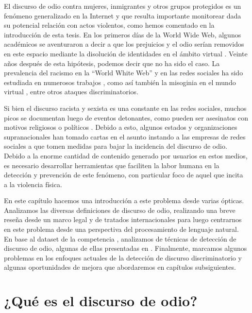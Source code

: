 
\label{chap:04_hate_speech}

El discurso de odio contra mujeres, inmigrantes y otros grupos protegidos es un fenómeno generalizado en la Internet y que resulta importante monitorear dada su potencial relación con actos violentos, como hemos comentado en la introducción de esta tesis. En los primeros días de la World Wide Web, algunos académicos se aventuraron a decir a que los prejuicios y el odio serían removidos en este espacio mediante la disolución de identidades en el ámbito virtual \cite{levy2001cyberculture, rheingold1993virtual}. Veinte años después de esta hipótesis, podemos decir que no ha sido el caso. La prevalencia del racismo en la ``World White Web''  y  en las redes sociales ha sido estudiada en numerosos trabajos \cite{adams2005white, kettrey2014staking}, como así también la misoginia en el mundo virtual \cite{filipovic2007blogging, mantilla2013gendertrolling}, entre otros ataques discriminatorios.

Si bien el discurso racista y sexista es una constante en las redes sociales, muchos picos se documentan luego de eventos detonantes, como pueden ser asesinatos con motivos religiosos o políticos \cite{burnap2015cyber}. Debido a esto, algunos estados y organizaciones supranacionales han tomado cartas en el asunto instando a las empresas de redes sociales a que tomen medidas para bajar la incidencia del discurso de odio. Debido a la enorme cantidad de contenido generado por usuarios en estos medios, es necesario desarrollar herramientas que faciliten la labor humana en la detección y prevención de este fenómeno, con particular foco de aquel que incita a la violencia física.


En este capítulo hacemos una introducción a este problema desde varias ópticas. Analizamos las diversas definiciones de discurso de odio, realizando una breve reseña desde un marco legal y de tratados internacionales para luego centrarnos en este problema desde una perspectiva del procesamiento de lenguaje natural. En base al dataset de la competencia \hateval{} \cite{hateval2019semeval}, analizamos de técnicas de detección de discurso de odio, algunas de ellas presentadas en \citet{perez-2019-atalaya}. Finalmente, marcamos algunos problemas en los enfoques actuales de la detección de discurso discriminatorio y algunas oportunidades de mejora que abordaremos en capítulos subsiguientes.


\section{¿Qué es el discurso de odio?}
\label{sec:hate_speech_definitions}

